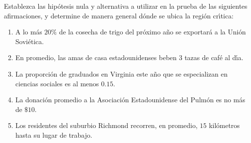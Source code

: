 \begin{enunciado}
 Establezca las hip\'otesis nula y alternativa a utilizar en la prueba de las siguientes afirmaciones, y determine de manera general d\'onde se ubica la regi\'on cr\'{\i}tica:
 \begin{enumerate}
  \item A lo m\'as $20\%$ de la cosecha de trigo del pr\'oximo a\~no se exportar\'a a la Uni\'on Sovi\'etica.
  \item En promedio, las amas de casa estadounidenses beben $3$ tazas de caf\'e al d\'{\i}a.
  \item La proporci\'on de graduados en Virginia este a\~no que se especializan en ciencias sociales es al menos $0.15$.
  \item La donaci\'on promedio a la Asociaci\'on Estadounidense del Pulm\'on es no m\'as de $\$10$.
  \item Los residentes del suburbio Richmond recorren, en promedio, $15$ kil\'ometros hasta su lugar de trabajo.
 \end{enumerate}
\end{enunciado}

